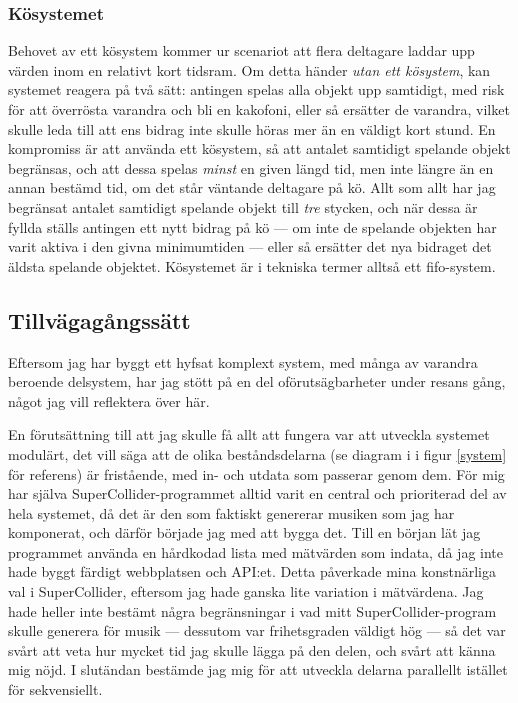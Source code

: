 \documentclass[11pt, a4paper]{article} %
\begin{document}
\subsubsection*{Kösystemet}
Behovet av ett kösystem kommer ur scenariot att flera deltagare laddar upp värden inom en relativt kort tidsram. Om detta händer \emph{utan ett kösystem}, kan systemet reagera på två sätt: antingen spelas alla objekt upp samtidigt, med risk för att överrösta varandra och bli en kakofoni, eller så ersätter de varandra, vilket skulle leda till att ens bidrag inte skulle höras mer än en väldigt kort stund. En kompromiss är att använda ett kösystem, så att antalet samtidigt spelande objekt begränsas, och att dessa spelas \emph{minst} en given längd tid, men inte längre än en annan bestämd tid, om det står väntande deltagare på kö. Allt som allt har jag begränsat antalet samtidigt spelande objekt till \emph{tre} stycken, och när dessa är fyllda ställs antingen ett nytt bidrag på kö --- om inte de spelande objekten har varit aktiva i den givna minimumtiden --- eller så ersätter det nya bidraget det äldsta spelande objektet. Kösystemet är i tekniska termer alltså ett \gls{fifo}-system.


\subsection*{Tillvägagångssätt}
Eftersom jag har byggt ett hyfsat komplext system, med många av varandra beroende delsystem, har jag stött på en del oförutsägbarheter under resans gång, något jag vill reflektera över här.

En förutsättning till att jag skulle få allt att fungera var att utveckla systemet modulärt, det vill säga att de olika beståndsdelarna (se diagram i i figur \ref{system} för referens) är fristående, med in- och utdata som passerar genom dem. För mig har själva SuperCollider-programmet alltid varit en central och prioriterad del av hela systemet, då det är den som faktiskt genererar musiken som jag har komponerat, och därför började jag med att bygga det. Till en början lät jag programmet använda en hårdkodad lista med mätvärden som indata, då jag inte hade byggt färdigt webbplatsen och API:et. Detta påverkade mina konstnärliga val i SuperCollider, eftersom jag hade ganska lite variation i mätvärdena. Jag hade heller inte bestämt några begränsningar i vad mitt SuperCollider-program skulle generera för musik --- dessutom var frihetsgraden väldigt hög --- så det var svårt att veta hur mycket tid jag skulle lägga på den delen, och svårt att känna mig nöjd. I slutändan bestämde jag mig för att utveckla delarna parallellt istället för sekvensiellt.
\end{document}
